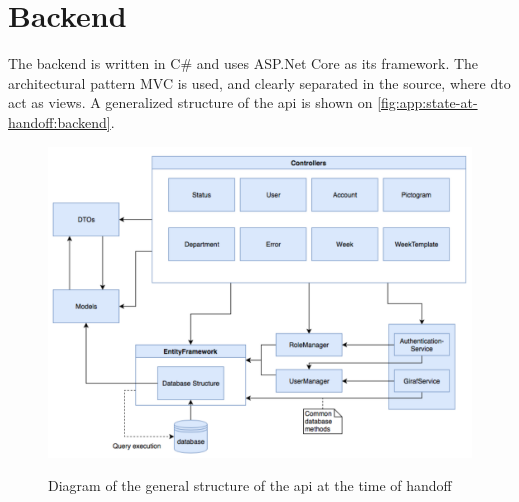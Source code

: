 \section{Backend}\label{app:state-at-handoff:backend}

The backend is written in C\# and uses ASP.Net Core as its framework. The architectural pattern MVC is used, and clearly separated in the source, where \gls{dto} act as views. A generalized structure of the \gls{api} is shown on \autoref{fig:app:state-at-handoff:backend}.

\begin{figure}[h]
    \centering
    \caption{Diagram of the general structure of the \gls{api} at the time of handoff}
    \includegraphics[width=1\textwidth]{figures/api_gen_struct_ho.png}
    \label{fig:app:state-at-handoff:backend}
\end{figure}
